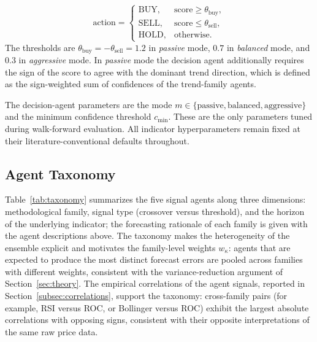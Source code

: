 \documentclass{ieeeaccess}
\begin{document}
\begin{equation}
\mathrm{action} =
\begin{cases}
\mathrm{BUY}, & \mathrm{score} \geq \theta_\text{buy}, \\
\mathrm{SELL}, & \mathrm{score} \leq \theta_\text{sell}, \\
\mathrm{HOLD}, & \mathrm{otherwise}.
\end{cases}
\end{equation}
The thresholds are $\theta_\text{buy} = -\theta_\text{sell} = 1.2$ in \emph{passive} mode, $0.7$ in \emph{balanced} mode, and $0.3$ in \emph{aggressive} mode. In \emph{passive} mode the decision agent additionally requires the sign of the score to agree with the dominant trend direction, which is defined as the sign-weighted sum of confidences of the trend-family agents.

The decision-agent parameters are the mode $m \in \{\text{passive}, \text{balanced}, \text{aggressive}\}$ and the minimum confidence threshold $c_{\min}$. These are the only parameters tuned during walk-forward evaluation. All indicator hyperparameters remain fixed at their literature-conventional defaults throughout.

\subsection{Agent Taxonomy}
\label{subsec:taxonomy}

Table~\ref{tab:taxonomy} summarizes the five signal agents along three dimensions: methodological family, signal type (crossover versus threshold), and the horizon of the underlying indicator; the forecasting rationale of each family is given with the agent descriptions above. The taxonomy makes the heterogeneity of the ensemble explicit and motivates the family-level weights $w_\kappa$: agents that are expected to produce the most distinct forecast errors are pooled across families with different weights, consistent with the variance-reduction argument of Section~\ref{sec:theory}. The empirical correlations of the agent signals, reported in Section~\ref{subsec:correlations}, support the taxonomy: cross-family pairs (for example, RSI versus ROC, or Bollinger versus ROC) exhibit the largest absolute correlations with opposing signs, consistent with their opposite interpretations of the same raw price data.
\end{document}
